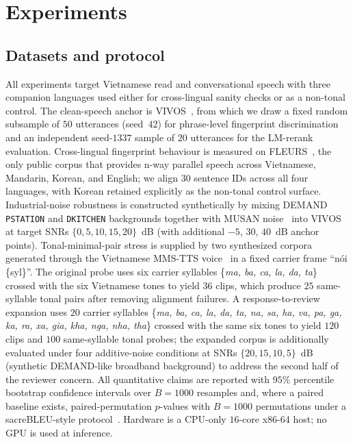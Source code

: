 \documentclass[a4paper,fleqn]{cas-dc}
\begin{document}
\FloatBarrier
\section{Experiments}\label{sec:experiments}

\subsection{Datasets and protocol}\label{sec:exp:data}

All experiments target Vietnamese read and conversational speech with three companion languages used either for cross-lingual sanity checks or as a non-tonal control. The clean-speech anchor is VIVOS~\citep{luong2016vivos}, from which we draw a fixed random subsample of $50$ utterances (seed~$42$) for phrase-level fingerprint discrimination and an independent seed-$1337$ sample of $20$ utterances for the LM-rerank evaluation. Cross-lingual fingerprint behaviour is measured on FLEURS~\citep{conneau2022fleurs}, the only public corpus that provides n-way parallel speech across Vietnamese, Mandarin, Korean, and English; we align $30$ sentence IDs across all four languages, with Korean retained explicitly as the non-tonal control surface. Industrial-noise robustness is constructed synthetically by mixing DEMAND~\citep{thiemann2013demand} \texttt{PSTATION} and \texttt{DKITCHEN} backgrounds together with MUSAN noise~\citep{snyder2015musan} into VIVOS at target SNRs $\{0, 5, 10, 15, 20\}$~dB (with additional $-5$, $30$, $40$~dB anchor points). Tonal-minimal-pair stress is supplied by two synthesized corpora generated through the Vietnamese MMS-TTS voice~\citep{pratap2024mms} in a fixed carrier frame ``n\'oi \{syl\}''. The original probe uses six carrier syllables \{\emph{ma, ba, ca, la, da, ta}\} crossed with the six Vietnamese tones to yield $36$ clips, which produce $25$ same-syllable tonal pairs after removing alignment failures. A response-to-review expansion uses $20$ carrier syllables \{\emph{ma, ba, ca, la, da, ta, na, sa, ha, va, pa, ga, ka, ra, xa, gia, kha, nga, nha, tha}\} crossed with the same six tones to yield $120$ clips and $100$ same-syllable tonal probes; the expanded corpus is additionally evaluated under four additive-noise conditions at SNRs $\{20, 15, 10, 5\}$~dB (synthetic DEMAND-like broadband background) to address the second half of the reviewer concern. All quantitative claims are reported with $95\%$ percentile bootstrap confidence intervals over $B = 1000$ resamples and, where a paired baseline exists, paired-permutation $p$-values with $B = 1000$ permutations under a sacreBLEU-style protocol~\citep{post2018call}. Hardware is a CPU-only $16$-core x86-64 host; no GPU is used at inference.
\end{document}
